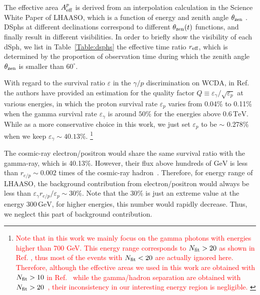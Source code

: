 \documentclass[12pt,aps,prd,amsmath,amssymb,showpacs,floats,floatfix,nofootinbib]{revtex4-1}
\def\red#1{{\textcolor{red}{#1}}} %
\def\TeV{\mathrm{TeV}} %
\def\GeV{\mathrm{GeV}} %
\begin{document}
The effective area $A_{\rm eff}^{p}$ is derived from an interpolation calculation in the Science White Paper of LHAASO, which is a function of energy and zenith angle $\theta_{\rm zen}$ \cite{Bai:2019khm}.
DSphs at different declinations correspond to different $\theta_{\rm zen}(t)$ functions, and finally result in different visibilities. In order to briefly show the visibility of each dSph, we list in Table~\ref{Table:dsphs} the effective time ratio $r_{\rm eff}$, which is determined by the proportion of observation time during which the zenith angle $\theta_{\rm zen}$ is smaller than $60^\circ$.

With regard to the survival ratio $\varepsilon$ in the $\gamma/p$ discrimination on WCDA,
in Ref.~\cite{Zha:2017vcs} the authors have provided an estimation for the quality factor $Q\equiv\varepsilon_{\gamma}/\sqrt{\varepsilon_{p}}$ at various energies, in which the proton survival rate $\varepsilon_{p}$ varies from 0.04\% to 0.11\% when the gamma survival rate $\varepsilon_{\gamma}$ is around $50\%$ for the energies above $0.6\,\TeV$. While as a more conservative choice in this work, we just set $\varepsilon_{p}$ to be $\sim$ 0.278\% when we keep $\varepsilon_{\gamma} \sim40.13\%$.
\footnote{\red{Note that in this work we mainly focus on the gamma photons with energies higher than 700 GeV.
    This energy range corresponds to $N_{\rm fit} > 20$ as shown in Ref. \cite{Zha:2017vcs}, thus most of the events with $N_{\rm fit} < 20$ are actually ignored here.
    Therefore, although the effective areas we used in this work are obtained with $N_{\rm fit} > 10$ in Ref.~\cite{Bai:2019khm} while the gamma/hadron separation are obtained with $N_{\rm fit}>20$~\cite{Zha:2017vcs}, their inconsistency in our interesting energy region is negligible.
}}


The cosmic-ray electron/positron would share the same survival ratio with the gamma-ray, which is 40.13\%.
However, their flux above hundreds of $\GeV$ is less than $r_{e/p}\sim0.002$ times of the cosmic-ray hadron~\cite{TheDAMPE:2017dtc,Aguilar:2015ooa}. Therefore, for energy range of LHAASO, the background contribution from electron/positron would always be less than $\varepsilon_{\gamma}r_{e/p}/\varepsilon_p\sim30\%$. Note that the $30\%$ is just an extreme value at the energy $300\,\GeV$, for higher energies, this number would rapidly decrease. Thus, we neglect this part of background contribution.
\end{document}
